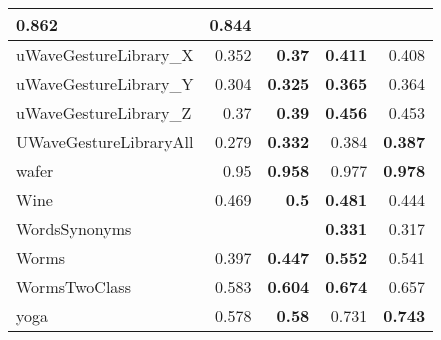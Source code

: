 \begin{longtable}{|l||r|r||r|r|}
\cellcolor[rgb]{ .973,  .796,  .678} \textbf{0.862} &
0.844
\bigstrut\\
\hline
uWaveGestureLibrary\_X &
0.352 &
\cellcolor[rgb]{ .973,  .796,  .678} \textbf{0.37} &
\cellcolor[rgb]{ .973,  .796,  .678} \textbf{0.411} &
0.408
\bigstrut\\
\hline
\rowcolor[rgb]{ .851,  .851,  .851} uWaveGestureLibrary\_Y &
0.304 &
\cellcolor[rgb]{ .973,  .796,  .678} \textbf{0.325} &
\cellcolor[rgb]{ .973,  .796,  .678} \textbf{0.365} &
0.364
\bigstrut\\
\hline
uWaveGestureLibrary\_Z &
0.37 &
\cellcolor[rgb]{ .973,  .796,  .678} \textbf{0.39} &
\cellcolor[rgb]{ .973,  .796,  .678} \textbf{0.456} &
0.453
\bigstrut\\
\hline
\rowcolor[rgb]{ .851,  .851,  .851} UWaveGestureLibraryAll &
0.279 &
\cellcolor[rgb]{ .973,  .796,  .678} \textbf{0.332} &
0.384 &
\cellcolor[rgb]{ .973,  .796,  .678} \textbf{0.387}
\bigstrut\\
\hline
wafer &
0.95 &
\cellcolor[rgb]{ .973,  .796,  .678} \textbf{0.958} &
0.977 &
\cellcolor[rgb]{ .973,  .796,  .678} \textbf{0.978}
\bigstrut\\
\hline
\rowcolor[rgb]{ .851,  .851,  .851} Wine &
0.469 &
\cellcolor[rgb]{ .973,  .796,  .678} \textbf{0.5} &
\cellcolor[rgb]{ .973,  .796,  .678} \textbf{0.481} &
0.444
\bigstrut\\
\hline
WordsSynonyms &
&
&
\cellcolor[rgb]{ .973,  .796,  .678} \textbf{0.331} &
0.317
\bigstrut\\
\hline
\rowcolor[rgb]{ .851,  .851,  .851} Worms &
0.397 &
\cellcolor[rgb]{ .973,  .796,  .678} \textbf{0.447} &
\cellcolor[rgb]{ .973,  .796,  .678} \textbf{0.552} &
0.541
\bigstrut\\
\hline
WormsTwoClass &
0.583 &
\cellcolor[rgb]{ .973,  .796,  .678} \textbf{0.604} &
\cellcolor[rgb]{ .973,  .796,  .678} \textbf{0.674} &
0.657
\bigstrut\\
\hline
\rowcolor[rgb]{ .851,  .851,  .851} yoga &
0.578 &
\cellcolor[rgb]{ .973,  .796,  .678} \textbf{0.58} &
0.731 &
\cellcolor[rgb]{ .973,  .796,  .678} \textbf{0.743}
\bigstrut\\
\hline
    \end{longtable}%

